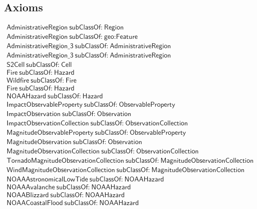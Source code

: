 \subsection{Axioms}
\begin{align}
  \textsf{AdministrativeRegion}~\textsf{subClassOf:}~\textsf{Region}\\
  \textsf{AdministrativeRegion}~\textsf{subClassOf:}~\textsf{geo:Feature}\\
  \textsf{AdministrativeRegion\_3}~\textsf{subClassOf:}~\textsf{AdministrativeRegion}\\
  \textsf{AdministrativeRegion\_3}~\textsf{subClassOf:}~\textsf{AdministrativeRegion}\\
  \textsf{S2Cell}~\textsf{subClassOf:}~\textsf{Cell}\\
  \textsf{Fire}~\textsf{subClassOf:}~\textsf{Hazard}\\
  \textsf{Wildfire}~\textsf{subClassOf:}~\textsf{Fire}\\
  \textsf{Fire}~\textsf{subClassOf:}~\textsf{Hazard}\\
  \textsf{NOAAHazard}~\textsf{subClassOf:}~\textsf{Hazard}\\
  \textsf{ImpactObservableProperty}~\textsf{subClassOf:}~\textsf{ObservableProperty}\\
  \textsf{ImpactObservation}~\textsf{subClassOf:}~\textsf{Observation}\\
  \textsf{ImpactObservationCollection}~\textsf{subClassOf:}~\textsf{ObservationCollection}\\
  \textsf{MagnitudeObservableProperty}~\textsf{subClassOf:}~\textsf{ObservableProperty}\\
  \textsf{MagnitudeObservation}~\textsf{subClassOf:}~\textsf{Observation}\\
  \textsf{MagnitudeObservationCollection}~\textsf{subClassOf:}~\textsf{ObservationCollection}\\
  \textsf{TornadoMagnitudeObservationCollection}~\textsf{subClassOf:}~\textsf{MagnitudeObservationCollection}\\
  \textsf{WindMagnitudeObservationCollection}~\textsf{subClassOf:}~\textsf{MagnitudeObservationCollection}\\
  \textsf{NOAAAstronomicalLowTide}~\textsf{subClassOf:}~\textsf{NOAAHazard}\\
  \textsf{NOAAAvalanche}~\textsf{subClassOf:}~\textsf{NOAAHazard}\\
  \textsf{NOAABlizzard}~\textsf{subClassOf:}~\textsf{NOAAHazard}\\
  \textsf{NOAACoastalFlood}~\textsf{subClassOf:}~\textsf{NOAAHazard}\\

\end{align}
